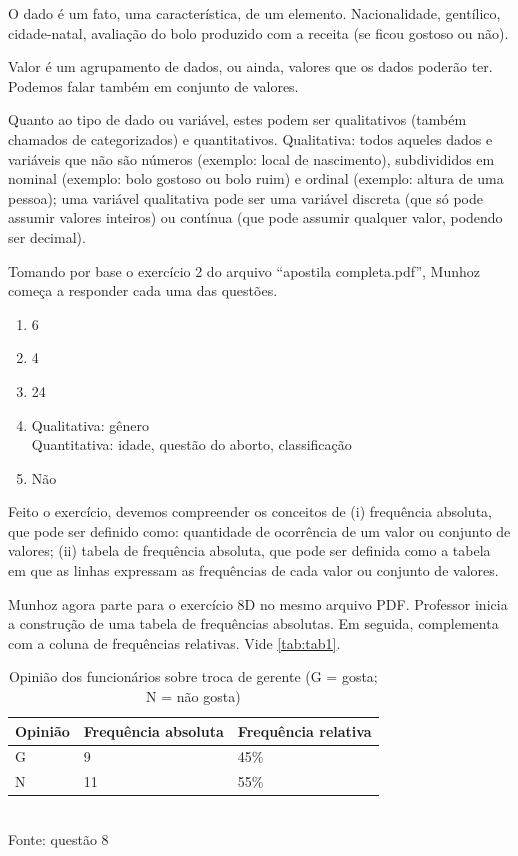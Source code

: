 \documentclass[a4paper]{article}
\begin{document}
	O dado é um fato, uma característica, de um elemento. Nacionalidade, gentílico, cidade-natal, avaliação do bolo produzido com a receita (se ficou gostoso ou não).
	
	Valor é um agrupamento de dados, ou ainda, valores que os dados poderão ter. Podemos falar também em conjunto de valores.
	
	Quanto ao tipo de dado ou variável, estes podem ser qualitativos (também chamados de categorizados) e quantitativos. Qualitativa: todos aqueles dados e variáveis que não são números (exemplo: local de nascimento), subdivididos em nominal (exemplo: bolo gostoso ou bolo ruim) e ordinal (exemplo: altura de uma pessoa); uma variável qualitativa pode ser uma variável discreta (que só pode assumir valores inteiros) ou contínua (que pode assumir qualquer valor, podendo ser decimal).
	
	Tomando por base o exercício 2 do arquivo ``apostila completa.pdf'', Munhoz começa a responder cada uma das questões.
	
	\begin{enumerate}[label=\alph*.]
		\item 6
		\item 4
		\item 24
		\item Qualitativa: gênero\\ Quantitativa: idade, questão do aborto, classificação
		\item Não
	\end{enumerate}
	
	Feito o exercício, devemos compreender os conceitos de (i) frequência absoluta, que pode ser definido como: quantidade de ocorrência de um valor ou conjunto de valores; (ii) tabela de frequência absoluta, que pode ser definida como a tabela em que as linhas expressam as frequências de cada valor ou conjunto de valores.
	
	Munhoz agora parte para o exercício 8D no mesmo arquivo PDF. Professor inicia a construção de uma tabela de frequências absolutas. Em seguida, complementa com a coluna de frequências relativas. Vide \autoref{tab:tab1}.
	
	\begin{table}[h]
		\centering
		\caption{Opinião dos funcionários sobre troca de gerente (G = gosta; N = não gosta)}
		\begin{tabular}{|l|l|l|}
			\hline
			\textbf{Opinião} & \textbf{Frequência absoluta} & \textbf{Frequência relativa} \\ \hline
			G & 9 & 45\% \\ \hline
			N & 11 & 55\% \\ \hline
		\end{tabular}
		\\ \vspace{1mm} Fonte: questão 8
		\label{tab:tab1}
	\end{table}
	
\end{document}
